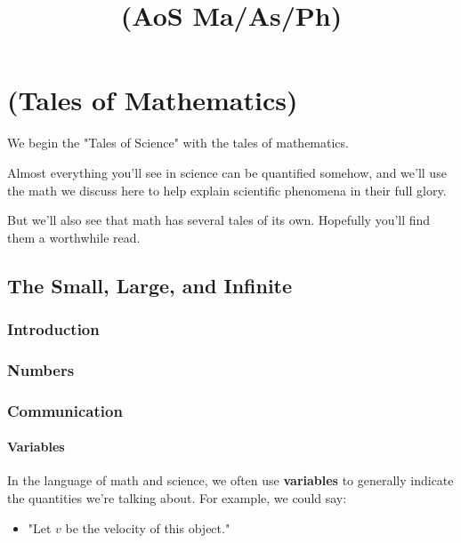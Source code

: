 \documentclass{book}
\title{(AoS Ma/As/Ph)}
\date{\vspace{-5ex}}
\begin{document}
\maketitle


\part{(Tales of Mathematics)}

We begin the "Tales of Science" with the tales of mathematics. 

Almost everything you'll see in science can be quantified somehow, and we'll use the math we discuss here to help explain scientific phenomena in their full glory. 

But we'll also see that math has several tales of its own. Hopefully you'll find them a worthwhile read. 



\chapter{The Small, Large, and Infinite}

\section{Introduction}



\section{Numbers}


\section{Communication}

\subsection{Variables}

In the language of math and science, we often use \textbf{variables} to generally indicate the quantities we're talking about. For example, we could say:

\begin{itemize}
\item "Let $v$ be the velocity of this object." %
\end{itemize}
\end{document}
